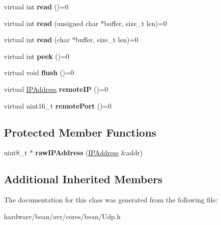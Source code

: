 \begin{DoxyCompactItemize}
\item 
\hypertarget{class_u_d_p_aa6f6357b921510120f1b686f79beaae1}{}virtual int {\bfseries read} ()=0\label{class_u_d_p_aa6f6357b921510120f1b686f79beaae1}

\item 
\hypertarget{class_u_d_p_a981d961c934e99104d068f8c7e6a20e8}{}virtual int {\bfseries read} (unsigned char $\ast$buffer, size\+\_\+t len)=0\label{class_u_d_p_a981d961c934e99104d068f8c7e6a20e8}

\item 
\hypertarget{class_u_d_p_ae7d3956d53a15921e601d027658d04bd}{}virtual int {\bfseries read} (char $\ast$buffer, size\+\_\+t len)=0\label{class_u_d_p_ae7d3956d53a15921e601d027658d04bd}

\item 
\hypertarget{class_u_d_p_a12b62e73ef1c5e343f841014dcd9512e}{}virtual int {\bfseries peek} ()=0\label{class_u_d_p_a12b62e73ef1c5e343f841014dcd9512e}

\item 
\hypertarget{class_u_d_p_a2bf28910b39ccd0da18c27d451552b45}{}virtual void {\bfseries flush} ()=0\label{class_u_d_p_a2bf28910b39ccd0da18c27d451552b45}

\item 
\hypertarget{class_u_d_p_a91e07b1dd9fc75f7919838442579cd14}{}virtual \hyperlink{class_i_p_address}{I\+P\+Address} {\bfseries remote\+I\+P} ()=0\label{class_u_d_p_a91e07b1dd9fc75f7919838442579cd14}

\item 
\hypertarget{class_u_d_p_aecc57f6433d817262d37695a62a1125e}{}virtual uint16\+\_\+t {\bfseries remote\+Port} ()=0\label{class_u_d_p_aecc57f6433d817262d37695a62a1125e}

\end{DoxyCompactItemize}
\subsection*{Protected Member Functions}
\begin{DoxyCompactItemize}
\item 
\hypertarget{class_u_d_p_abf58d27ff82d0c84cd6b5b939b7d7be6}{}uint8\+\_\+t $\ast$ {\bfseries raw\+I\+P\+Address} (\hyperlink{class_i_p_address}{I\+P\+Address} \&addr)\label{class_u_d_p_abf58d27ff82d0c84cd6b5b939b7d7be6}

\end{DoxyCompactItemize}
\subsection*{Additional Inherited Members}


The documentation for this class was generated from the following file\+:\begin{DoxyCompactItemize}
\item 
hardware/bean/avr/cores/bean/Udp.\+h\end{DoxyCompactItemize}
